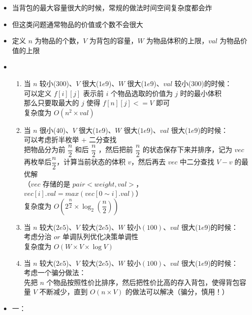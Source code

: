 \documentclass[E:/GsjzTle/main/main.tex]{subfiles}
\begin{document}
\begin{itemize}
\item
  当背包的最大容量很大的时候，常规的做法时间空间复杂度都会炸
\item
  但这类问题通常物品的价值或个数不会很大
\item
  定义 \(n\) 为物品的个数，\(V\) 为背包的容量，\(W\)
  为物品体积的上限，\(val\) 为物品价值的上限
\item
  \begin{enumerate}
  \def\labelenumi{\arabic{enumi}.}
  \item
    当 \(n\) 较小(\(300\))、\(V\) 很大(\(1e9\))、\(W\)
    很大(\(1e9\))、\(val\) 较小(\(300\))的时候：\\
    可以定义 \(f[i][j]\) 表示前 \(i\) 个物品选取的价值为 \(j\)
    时的最小体积\\
    那么只要取最大的 \(j\) 使得 \(f[n][j] <= V\) 即可\\
    复杂度为 \(O(n^2\times val)\)
  \item
    当 \(n\) 很小(\(40\))、\(V\) 很大(\(1e9\))、\(W\)
    很大(\(1e9\))、\(val\) 很大(\(1e9\))的时候：\\
    可以考虑折半枚举 \(+\) 二分查找\\
    把物品分为前 \(\dfrac{n}{2}\) 和后 \(\dfrac{n}{2}\) ，然后把前
    \(\dfrac{n}{2}\) 的状态保存下来并排序，记为 \(vec\)\\
    再枚举后\(\dfrac{n}{2}\)，计算当前状态的体积 \(v\)，然后再去 \(vec\)
    中二分查找 \(V-v\) 的最优解\\
    （\(vec\) 存储的是
    \(pair<weight , val>\)，\(vec[i].val = max(vec[0\sim i].val)\)）\\
    复杂度为
    \(O(2^{\dfrac{n}{2}}\times \log _{2}\left( \dfrac{n}{2}\right) )\)
  \item
    当 \(n\) 较大(\(2e5\))、\(V\) 较大(\(2e5\))、\(W\)
    较小\((100)\)、\(val\) 很大(\(1e9\))的时候：\\
    考虑分治 \(or\) 单调队列优化决策单调性\\
    复杂度为 \(O(W\times V\times \log{V})\)
  \item
    当 \(n\) 较大(\(2e5\))、\(V\) 较大(\(2e5\))、\(W\)
    较小\((100)\)、\(val\) 很大(\(1e9\))的时候：\\
    考虑一个骗分做法：\\
    先把 \(n\)
    个物品按照性价比排序，然后把性价比高的存入背包，使得背包容量 \(V\)
    不断减少，直到 \(O(n \times V)\) 的做法可以解决（骗分，慎用！）
  \end{enumerate}
\item
  一：


\end{itemize}
\end{document}
